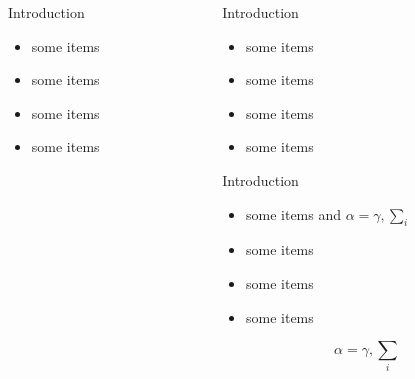 \documentclass[final]{beamer}
\begin{document}
\begin{frame}[fragile]
\begin{columns}[t]
\begin{column}{.48\linewidth}
\begin{block}{Introduction}
\begin{itemize}
\item some items
\item some items
\item some items
\item some items
\end{itemize}
\end{block}

\end{column}
\begin{column}{.48\linewidth}
\begin{block}{Introduction}
\begin{itemize}
\item some items
\item some items
\item some items
\item some items
\end{itemize}
\end{block}

\begin{block}{Introduction}
\begin{itemize}
\item some items and $\alpha=\gamma, \sum_{i}$
\item some items
\item some items
\item some items
\end{itemize}
$$\alpha=\gamma, \sum_{i}$$
\end{block}

\end{column}
\end{columns}

\end{frame}
\end{document}
